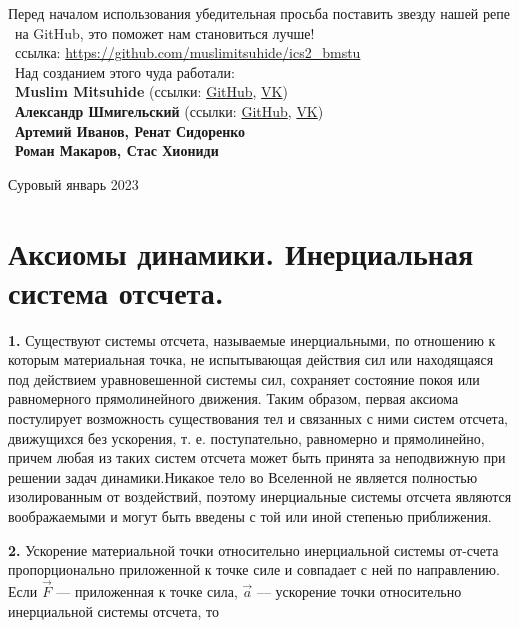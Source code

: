 \normalsize{ 

Перед началом использования убедительная просьба поставить звезду нашей репе\\\
на GitHub, это поможет нам становиться лучше!\\\
ссылка: \textcolor{blue}{\url{https://github.com/muslimitsuhide/ics2_bmstu}}\\\
Над созданием этого чуда работали:\\\
\textbf{Muslim Mitsuhide} (ссылки: \textcolor{purple}{\href{https://github.com/muslimitsuhide}{GitHub}}, \textcolor{purple}{\href{https://vk.com/muslimitsuhide}{VK}})\\\
\textbf{Александр Шмигельский} (ссылки: \textcolor{purple}{\href{https://github.com/AlexShmigelskii}{GitHub}}, \textcolor{purple}{\href{https://vk.com/syn_maminoy_podrug}{VK}})\\\
\textbf{Артемий Иванов, Ренат Сидоренко}\\\
\textbf{Роман Макаров, Стас Хиониди}



\hfill \break
\hfill \break
\begin{center} Суровый январь 2023 \end{center}
 
\thispagestyle{empty} %

\newpage
\section{Аксиомы динамики. Инерциальная система отсчета.}
\begin{center}
   \par \textbf{1.} Существуют системы отсчета, называемые инерциальными, по отношению к которым материальная точка, не  испытывающая действия сил или находящаяся под действием уравновешенной системы сил, сохраняет состояние покоя или равномерного прямолинейного движения. Таким образом, первая аксиома постулирует возможность существования тел и связанных с ними систем отсчета, движущихся без ускорения, т. е. поступательно, равномерно и прямолинейно, причем любая из таких систем отсчета может быть принята за неподвижную при решении задач динамики.Никакое тело во  Вселенной  не  является полностью изолированным  от воздействий, поэтому инерциальные системы отсчета являются воображаемыми и могут быть введены с той или иной степенью приближения.
   
   \par \textbf{2.} Ускорение материальной точки относительно инерциальной системы от-счета пропорционально приложенной к точке силе и совпадает с ней по направлению. Если $\vec{F}$ — приложенная к точке сила,  $\vec{a}$  — ускорение точки относительно инерциальной системы отсчета, то
   

\end{center}}
